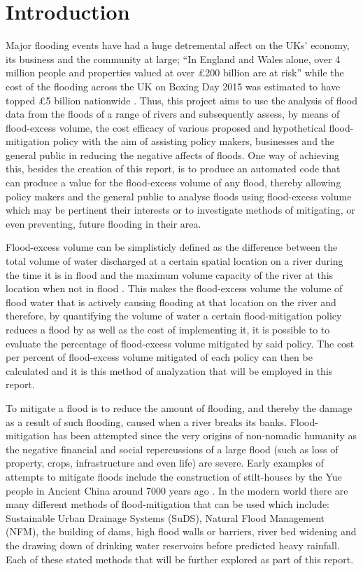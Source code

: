 \documentclass[11pt,a4paper]{article}
\begin{document}
\newpage
\section{Introduction}
Major flooding events have had a huge detremental affect on the UKs' economy, its business and the community at large{;} ``In England and Wales alone, over 4 million people and properties valued at over £200 billion are at risk'' \cite{foresight} while the cost of the flooding across the UK on Boxing Day 2015 was estimated to have topped \pounds5 billion nationwide \cite{telegraph}. Thus, this project aims to use the analysis of flood data from the floods of a range of rivers and subsequently assess, by means of flood-excess volume, the cost efficacy of various proposed and hypothetical flood-mitigation policy with the aim of assisting policy makers, businesses and the general public in reducing the negative affects of floods. One way of achieving this, besides the creation of this report, is to produce an automated code that can produce a value for the flood-excess volume of any flood, thereby allowing policy makers and the general public to analyse floods using flood-excess volume which may be pertinent their interests or to investigate methods of mitigating, or even preventing, future flooding in their area.

Flood-excess volume can be simplisticly defined as the difference between the total volume of water discharged at a certain spatial location on a river during the time it is in flood and the maximum volume capacity of the river at this location when not in flood \cite{Aire}. This makes the flood-excess volume the volume of flood water that is actively causing flooding at that location on the river and therefore, by quantifying the volume of water a certain flood-mitigation policy reduces a flood by as well as the cost of implementing it, it is possible to to evaluate the percentage of flood-excess volume mitigated by said policy. The cost per percent of flood-excess volume mitigated of each policy can then be calculated and it is this method of analyzation that will be employed in this report.

To mitigate a flood is to reduce the amount of flooding, and thereby the damage as a result of such flooding, caused when a river breaks its banks. Flood-mitigation has been attempted since the very origins of non-nomadic humanity as the negative financial and social repercussions of a large flood (such as loss of property, crops, infrastructure and even life) are severe. Early examples of attempts to mitigate floods include the construction of stilt-houses by the Yue people in Ancient China around 7000 years ago \cite{yue}. In the modern world there are many different methods of flood-mitigation that can be used which include: Sustainable Urban Drainage Systems (SuDS), Natural Flood Management (NFM), the building of dams, high flood walls or barriers, river bed widening and the drawing down of drinking water reservoirs before predicted heavy rainfall. Each of these stated methods that will be further explored as part of this report.
\end{document}
